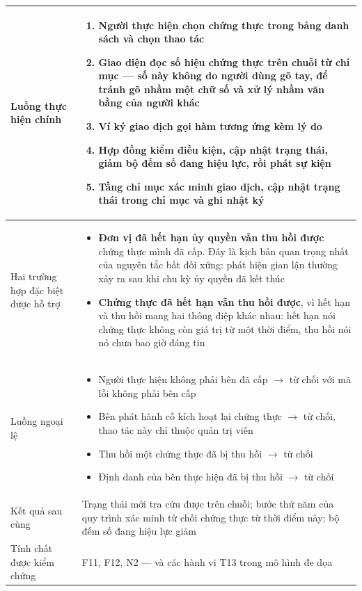 \begin{longtable}{|p{3.4cm}|p{10.3cm}|}
Luồng thực hiện chính &
\begin{enumerate}[leftmargin=*, nosep]
    \item Người thực hiện chọn chứng thực trong bảng danh sách và chọn thao tác
    \item Giao diện đọc số hiệu chứng thực trên chuỗi từ chỉ mục --- số này không do người dùng gõ tay, để tránh gõ nhầm một chữ số và xử lý nhầm văn bằng của người khác
    \item Ví ký giao dịch gọi hàm tương ứng kèm lý do
    \item Hợp đồng kiểm điều kiện, cập nhật trạng thái, giảm bộ đếm số đang hiệu lực, rồi phát sự kiện
    \item Tầng chỉ mục xác minh giao dịch, cập nhật trạng thái trong chỉ mục và ghi nhật ký
\end{enumerate} \\
\hline

Hai trường hợp đặc biệt được hỗ trợ &
\begin{itemize}[leftmargin=*, nosep]
    \item \textbf{Đơn vị đã hết hạn ủy quyền vẫn thu hồi được} chứng thực mình đã cấp. Đây là kịch bản quan trọng nhất của nguyên tắc bất đối xứng: phát hiện gian lận thường xảy ra sau khi chu kỳ ủy quyền đã kết thúc
    \item \textbf{Chứng thực đã hết hạn vẫn thu hồi được}, vì hết hạn và thu hồi mang hai thông điệp khác nhau: hết hạn nói chứng thực không còn giá trị từ một thời điểm, thu hồi nói nó chưa bao giờ đáng tin
\end{itemize} \\
\hline

Luồng ngoại lệ &
\begin{itemize}[leftmargin=*, nosep]
    \item Người thực hiện không phải bên đã cấp $\rightarrow$ từ chối với mã lỗi không phải bên cấp
    \item Bên phát hành cố kích hoạt lại chứng thực $\rightarrow$ từ chối, thao tác này chỉ thuộc quản trị viên
    \item Thu hồi một chứng thực đã bị thu hồi $\rightarrow$ từ chối
    \item Định danh của bên thực hiện đã bị thu hồi $\rightarrow$ từ chối
\end{itemize} \\
\hline

Kết quả sau cùng &
Trạng thái mới tra cứu được trên chuỗi; bước thứ năm của quy trình xác minh từ chối chứng thực từ thời điểm này; bộ đếm số đang hiệu lực giảm \\
\hline

Tính chất được kiểm chứng &
F11, F12, N2 --- và các hành vi T13 trong mô hình đe dọa \\
\hline

\end{longtable}
